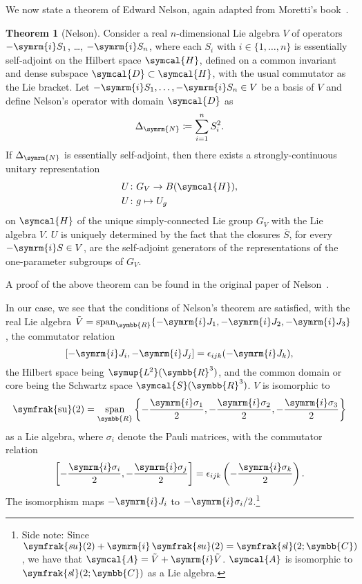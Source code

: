 \documentclass[12pt, a4 paper]{article}
\theoremstyle{definition}
\newtheorem{thm}{Theorem}
\newcommand{\ltwo}{\symup{L\kern-0.5pt^2}}
\newcommand{\ltworthree}{\ltwo(\rr^3)}
\newcommand{\rr}{\symbb{R}}
\newcommand{\cc}{\symbb{C}}
\newcommand{\hilbert}{\symcal{H}}
\newcommand{\schwartz}{\symcal{S}}
\newcommand{\schwartzrthree}{\schwartz(\rr^3)}
\renewcommand{\i}{\symrm{i}}
\newcommand{\domain}{\symcal{D}}
\DeclareMathOperator{\spann}{span}
\newcommand{\sutwo}{\operatorname{\symfrak{su}}(2)}
\begin{document}
    We now state a theorem of Edward Nelson, again adapted from Moretti's book~\cite[p.~291]{MorettiFundamental}.
    \begin{thm}[Nelson]
        Consider a real \(n\)-dimensional Lie algebra \(V\) of operators \(-\i S_1\), \ldots, \(-\i S_n\), where each \(S_i\) with \(i \in \{1, \ldots, n\}\) is essentially self-adjoint on the Hilbert space \(\hilbert\), defined on a common invariant and dense subspace \(\domain \subset \hilbert\), with the usual commutator as the Lie bracket.
        Let \(-\i S_1, \ldots, -\i S_n \in V\) be a basis of \(V\) and define Nelson's operator with domain \(\domain\) as
        \[
            \Delta_{\symrm{N}} \coloneq \sum_{i=1}^{n} S_i^2.
        \]
        If \(\Delta_{\symrm{N}}\) is essentially self-adjoint, then there exists a strongly-continuous unitary representation
        \begin{align*}
            U &\colon G_V \rightarrow B(\hilbert),\\
            U &\colon g \mapsto U_g
        \end{align*}
        on \(\hilbert\) of the unique simply-connected Lie group \(G_V\) with the Lie algebra \(V\).
        \(U\) is uniquely determined by the fact that the closures \(\overline{S}\), for every \(-\i S \in V\), are the self-adjoint generators of the representations of the one-parameter subgroups of \(G_V\).
    \end{thm}
    A proof of the above theorem can be found in the original paper of Nelson~\cite{Nelson}.

    In our case, we see that the conditions of Nelson's theorem are satisfied, with the real Lie algebra \(\tilde{V} = \spann_{\rr}\{-\i J_1, -\i J_2, -\i J_3\}\), the commutator relation \[[-\i J_i, -\i J_j] = \epsilon_{ijk}(-\i J_k),\] the Hilbert space being \(\ltworthree\), and the common domain or core  being the Schwartz space \(\schwartzrthree\). \(V\) is isomorphic to \[\displaystyle\sutwo = \spann_{\rr}\left\{-\frac{\i\sigma_1}{2}, -\frac{\i\sigma_2}{2}, -\frac{\i\sigma_3}{2}\right\}\] as a Lie algebra, where \(\sigma_i\) denote the Pauli matrices, with the commutator relation \[\displaystyle\left[-\frac{\i\sigma_i}{2}, -\frac{\i\sigma_j}{2}\right] = \epsilon_{ijk}\left(-\frac{\i\sigma_k}{2}\right).\] The isomorphism maps \(-\i J_i\) to \(-\i \sigma_i/2\).\footnote{Side note: Since \(\symfrak{s\kern-0.6ptu}(2) + \i\,\symfrak{s\kern-0.6ptu}(2) = \symfrak{s\kern-0.8ptl}(2;\cc)\), we have that \(\symcal{A} = \tilde{V} + \i \tilde{V}\). \(\symcal{A}\) is isomorphic to \(\symfrak{s\kern-0.8ptl}(2;\cc)\) as a Lie algebra.}
\end{document}

